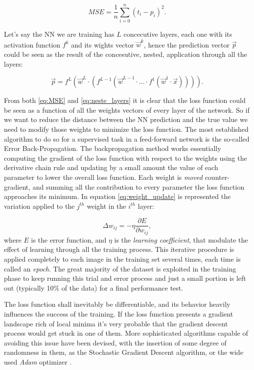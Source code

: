 \begin{equation}
    MSE = \frac{1}{n} \sum_{i=0}^{n} (t_i - p_i)^2.
    \label{eq:MSE}
\end{equation}

Let's say the NN we are training has $L$ concecutive layers, each one with its activation function $f^k$ and its wights vector $\vec w^k$, hence the prediction vector $\vec p$ could be seen as the result of the concesutive, nested, application through all the layers:

\begin{equation}
    \vec p = f^L(\vec w^L \cdot (f^{L-1}(\vec w^{L-1} \cdot ... \cdot f^1(\vec w^1 \cdot \vec x)))).
    \label{eq:neste_layers}
\end{equation}

From both \ref{eq:MSE} and \ref{eq:neste_layers} it is clear that the loss function could be seen as a function of all the weights vectors of every layer of the network. So if we want to reduce the distance between the NN prediction and the true value we need to modify those weights to minimize the loss function. The most established algorithm to do so for a supervised task in a feed-forward network is the so-called Error Back-Propagation. The backpropagation method works essentially computing the gradient of the loss function with respect to the weights using the derivative chain rule and updating by a small amount the value of each parameter to lower the overall loss function. Each weight is  \textit{moved} counter-gradient, and summing all the contribution to every parameter the loss function approaches its minimum. In equation \ref{eq:weight_update} is represented the variation applied to the $j^{th}$ weight in the $i^{th}$ layer:

\begin{equation}
    \Delta w_{ij} = - \eta \frac{\partial E}{\partial w_{ij}},
    \label{eq:weight_update}
\end{equation}
where $E$ is the error function, and $\eta$ is the \textit{learning coefficient}, that modulate the effect of learning through all the training process. This iterative procedure is applied completely to each image in the training set several times, each time is called an \textit{epoch}. The great majority of the dataset is exploited in the training phase to keep running this trial and error process and just a small portion is left out (typically 10\% of the data) for a final performance test.


The loss function shall inevitably be differentiable, and its behavior heavily influences the success of the training. If the loss function presents a gradient landscape rich of local minima it's very probable that the gradient descent process would get stuck in one of them. More sophisticated algorithms capable of avoiding this issue have been devised, with the insertion of some degree of randomness in them, as the Stochastic Gradient Descent algorithm, or the wide used \textit{Adam} optimizer \cite{1412.6980}.

